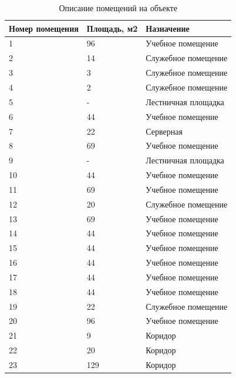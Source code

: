 \begin{longtable}{|p{5cm}|p{3cm}|p{8cm}|}
    \caption{Описание помещений на объекте}
    \label{tab::rooms_description} \\

    \hline
    Номер помещения &
    Площадь, м2 &
    Назначение \\
    \hline
    1 &
    96 &
    Учебное помещение \\
    \hline
    2 &
    14 &
    Служебное помещение \\
    \hline
    3 &
    3 &
    Служебное помещение \\
    \hline
    4 &
    2 &
    Служебное помещение \\
    \hline
    5 &
    - &
    Лестничная площадка \\
    \hline
    6 &
    44 &
    Учебное помещение \\
    \hline
    7 &
    22 &
    Серверная \\
    \hline
    8 &
    69 &
    Учебное помещение \\
    \hline
    9 &
    - &
    Лестничная площадка \\
    \hline
    10 &
    44 &
    Учебное помещение \\
    \hline
    11 &
    69 &
    Учебное помещение \\
    \hline
    12 &
    20 &
    Служебное помещение \\
    \hline
    13 &
    69 &
    Учебное помещение \\
    \hline
    14 &
    44 &
    Учебное помещение \\
    \hline
    15 &
    44 &
    Учебное помещение \\
    \hline
    16 &
    44 &
    Учебное помещение \\
    \hline
    17 &
    44 &
    Учебное помещение \\
    \hline
    18 &
    44 &
    Учебное помещение \\
    \hline
    19 &
    22 &
    Служебное помещение \\
    \hline
    20 &
    96 &
    Учебное помещение \\
    \hline
    21 &
    9 &
    Коридор \\
    \hline
    22 &
    20 &
    Коридор \\
    \hline
    23 &
    129 &
    Коридор \\
    \hline
\end{longtable}